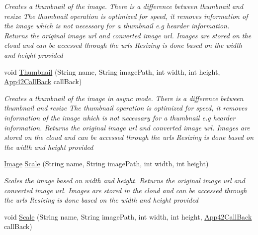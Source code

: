\begin{DoxyCompactItemize}
\begin{DoxyCompactList}\small\item\em Creates a thumbnail of the image. There is a difference between thumbnail and resize The thumbnail operation is optimized for speed, it removes information of the image which is not necessary for a thumbnail e.\+g hearder information. Returns the original image url and converted image url. Images are stored on the cloud and can be accessed through the urls Resizing is done based on the width and height provided \end{DoxyCompactList}\item 
void \hyperlink{classcom_1_1shephertz_1_1app42_1_1paas_1_1sdk_1_1csharp_1_1image_processor_1_1_image_processor_service_a5bbb2c097a80b9ad662367bdf4539a0d}{Thumbnail} (String name, String image\+Path, int width, int height, \hyperlink{interfacecom_1_1shephertz_1_1app42_1_1paas_1_1sdk_1_1csharp_1_1_app42_call_back}{App42\+Call\+Back} call\+Back)
\begin{DoxyCompactList}\small\item\em Creates a thumbnail of the image in async mode. There is a difference between thumbnail and resize The thumbnail operation is optimized for speed, it removes information of the image which is not necessary for a thumbnail e.\+g hearder information. Returns the original image url and converted image url. Images are stored on the cloud and can be accessed through the urls Resizing is done based on the width and height provided \end{DoxyCompactList}\item 
\hyperlink{classcom_1_1shephertz_1_1app42_1_1paas_1_1sdk_1_1csharp_1_1image_processor_1_1_image}{Image} \hyperlink{classcom_1_1shephertz_1_1app42_1_1paas_1_1sdk_1_1csharp_1_1image_processor_1_1_image_processor_service_ae227697809affaaff7daefae684cf0d4}{Scale} (String name, String image\+Path, int width, int height)
\begin{DoxyCompactList}\small\item\em Scales the image based on width and height. Returns the original image url and converted image url. Images are stored in the cloud and can be accessed through the urls Resizing is done based on the width and height provided \end{DoxyCompactList}\item 
void \hyperlink{classcom_1_1shephertz_1_1app42_1_1paas_1_1sdk_1_1csharp_1_1image_processor_1_1_image_processor_service_a54a9eeb8faf35d7bb57a8a0c6c89b9fd}{Scale} (String name, String image\+Path, int width, int height, \hyperlink{interfacecom_1_1shephertz_1_1app42_1_1paas_1_1sdk_1_1csharp_1_1_app42_call_back}{App42\+Call\+Back} call\+Back)

\end{DoxyCompactItemize}
